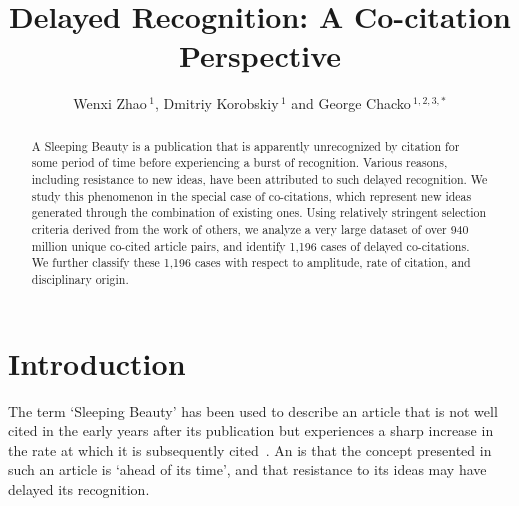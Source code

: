 \documentclass[utf8]{frontiersSCNS}
\def\firstAuthorLast{Zhao {et~al.}} %
\def\Authors{Wenxi Zhao\,$^{1}$, Dmitriy Korobskiy\,$^{1}$  and George Chacko\,$^{1,2,3,*}$}
\begin{document}
\onecolumn
{}

\title[Delayed Co-citations]{Delayed Recognition: A Co-citation Perspective} 

\author[\firstAuthorLast ]{\Authors} %
\address{} %
\correspondance{} %

\extraAuth{}%


\maketitle

\begin{abstract}
A Sleeping Beauty is a publication that is apparently unrecognized by citation for some period of time before experiencing a burst of recognition. Various reasons, including resistance to new ideas, have been attributed to such delayed recognition. We study this phenomenon in the special case of co-citations, which represent new ideas generated through the combination of existing ones. Using relatively stringent selection criteria derived from the work of others, we analyze a very large dataset of over 940 million unique co-cited article pairs, and identify 1,196 cases of delayed co-citations. We further classify these 1,196 cases with respect to amplitude, rate of citation, and disciplinary origin. 

\end{abstract}

\section{Introduction}

The term `Sleeping Beauty' has been used to describe an article that is not well cited in the early years after its publication but experiences a sharp increase in the rate at which it is subsequently cited~\citep{Raan2004}. An 
is that the concept presented in such an article is `ahead of its time', and that resistance to its ideas may have delayed its recognition.
\end{document}
